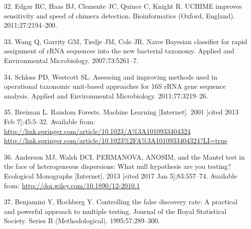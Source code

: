 \documentclass[12pt,]{article}
\begin{document}
\hypertarget{ref-edgar_uchime_2011}{}
32. Edgar RC, Haas BJ, Clemente JC, Quince C, Knight R. UCHIME improves
sensitivity and speed of chimera detection. Bioinformatics (Oxford,
England). 2011;27:2194--200.

\hypertarget{ref-wang_naive_2007}{}
33. Wang Q, Garrity GM, Tiedje JM, Cole JR. Naive Bayesian classifier
for rapid assignment of rRNA sequences into the new bacterial taxonomy.
Applied and Environmental Microbiology. 2007;73:5261--7.

\hypertarget{ref-schloss_assessing_2011}{}
34. Schloss PD, Westcott SL. Assessing and improving methods used in
operational taxonomic unit-based approaches for 16S rRNA gene sequence
analysis. Applied and Environmental Microbiology. 2011;77:3219--26.

\hypertarget{ref-breiman_random_2001}{}
35. Breiman L. Random Forests. Machine Learning {[}Internet{]}. 2001
{[}cited 2013 Feb 7{]};45:5--32. Available from:
\href{http://link.springer.com/article/10.1023/A\%3A1010933404324\%20http://link.springer.com/article/10.1023\%2FA\%3A1010933404324?LI=true}{http://link.springer.com/article/10.1023/A\%3A1010933404324 http://link.springer.com/article/10.1023\%2FA\%3A1010933404324?LI=true}

\hypertarget{ref-anderson_permanova_2013}{}
36. Anderson MJ, Walsh DCI. PERMANOVA, ANOSIM, and the Mantel test in
the face of heterogeneous dispersions: What null hypothesis are you
testing? Ecological Monographs {[}Internet{]}. 2013 {[}cited 2017 Jan
5{]};83:557--74. Available from:
\url{http://doi.wiley.com/10.1890/12-2010.1}

\hypertarget{ref-benjamini_controlling_1995}{}
37. Benjamini Y, Hochberg Y. Controlling the false discovery rate: A
practical and powerful approach to multiple testing. Journal of the
Royal Statistical Society. Series B (Methodological). 1995;57:289--300.
\end{document}
